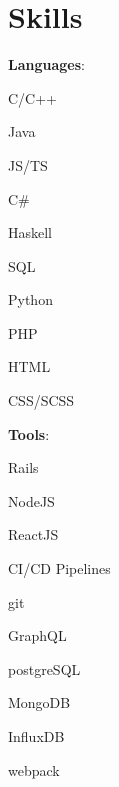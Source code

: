 \documentclass{resume}
\begin{document}
	\section{Skills}%
	\setlength{\columnsep}{1pc}%
	\setlength{\multicolsep}{0pt}%
	\begin{multicols}{3}%
		\textbf{Languages}:
		\begin{multicols}{2}
			\begin{loneinnerlist}
				\item C/C++
				\item Java
				\item JS/TS %
				\item C\#
				\item Haskell
				\item SQL
				\item Python
				\item PHP
				\item HTML
				\item CSS/SCSS
			\end{loneinnerlist}
		\end{multicols}
		\columnbreak
		\textbf{Tools}:
		\begin{multicols}{2}
			\begin{loneinnerlist}
				\item Rails
				\item NodeJS
				\item ReactJS
				\item CI/CD Pipelines
				\item git
				\item GraphQL
				\item postgreSQL
				\item MongoDB
				\item InfluxDB
				\item webpack

\end{loneinnerlist}
\end{multicols}
\end{multicols}
\end{document}
